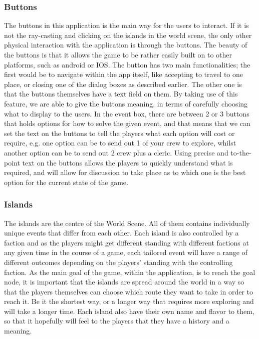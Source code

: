 \subsubsection{Buttons}	

The buttons in this application is the main way for the users to interact. If it is not the ray-casting and clicking on the islands in the world scene, the only other physical interaction with the application is through the buttons. The beauty of the buttons is that it allows the game to be rather easily built on to other platforms, such as android or IOS. The button has two main functionalities; the first would be to navigate within the app itself, like accepting to travel to one place, or closing one of the dialog boxes as described earlier. The other one is that the buttons themselves have a text field on them. By taking use of this feature, we are able to give the buttons meaning, in terms of carefully choosing what to display to the users. In the event box, there are between 2 or 3 buttons that holds options for how to solve the given event, and that means that we can set the text on the buttons to tell the players what each option will cost or require, e.g. one option can be to send out 1 of your crew to explore, whilst another option can be to send out 2 crew plus a cleric. Using precise and to-the-point text on the buttons allows the players to quickly understand what is required, and will allow for discussion to take place as to which one is the best option for the current state of the game.

\subsubsection{Islands}
	
The islands are the centre of the World Scene. All of them contains individually unique events that differ from each other. Each island is also controlled by a faction and as the players might get different standing with different factions at any given time in the course of a game, each tailored event will have a range of different outcomes depending on the players' standing with the controlling faction. 
As the main goal of the game, within the application, is to reach the goal node, it is important that the islands are spread around the world in a way so that the players themselves can choose which route they want to take in order to reach it. Be it the shortest way, or a longer way that requires more exploring and will take a longer time. Each island also have their own name and flavor to them, so that it hopefully will feel to the players that they have a history and a meaning.

